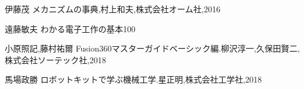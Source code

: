 \begin{thebibliography}{99}

伊藤茂
メカニズムの事典,村上和夫,株式会社オーム社,2016

 遠藤敏夫 わかる電子工作の基本100

小原照記,藤村祐爾 Fusion360マスターガイドベーシック編.柳沢淳一,久保田賢二,株式会社ソーテック社,2018

 馬場政勝 ロボットキットで学ぶ機械工学.星正明,株式会社工学社,2018

\end{thebibliography}